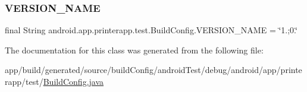 \subsubsection{\texorpdfstring{V\+E\+R\+S\+I\+O\+N\+\_\+\+N\+A\+ME}{VERSION\_NAME}}
{\footnotesize\ttfamily final String android.\+app.\+printerapp.\+test.\+Build\+Config.\+V\+E\+R\+S\+I\+O\+N\+\_\+\+N\+A\+ME = \char`\"{}1.;0.\char`\"{}\hspace{0.3cm}{\ttfamily [static]}}



The documentation for this class was generated from the following file\+:\begin{DoxyCompactItemize}
\item 
app/build/generated/source/build\+Config/android\+Test/debug/android/app/printerapp/test/\hyperlink{app_2build_2generated_2source_2build_config_2android_test_2debug_2android_2app_2printerapp_2test_2_build_config_8java}{Build\+Config.\+java}\end{DoxyCompactItemize}
